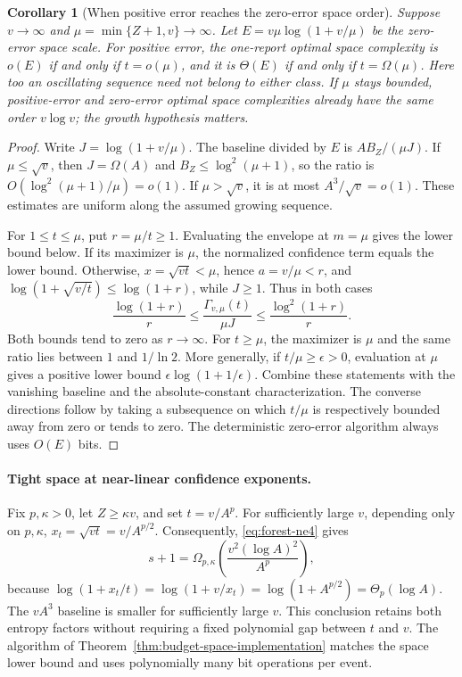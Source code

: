 \documentclass[11pt,letterpaper]{article}
\newtheorem{corollary}[theorem]{Corollary}
\numberwithin{equation}{section}
\begin{document}
\begin{corollary}[When positive error reaches the zero-error space order]
\label{cor:budget-saturation}
Suppose $v\to\infty$ and $\mu=\min\{Z+1,v\}\to\infty$.
Let $E=v\mu\log(1+v/\mu)$ be the zero-error space scale.
For positive error, the one-report optimal space complexity is $o(E)$ if and only if $t=o(\mu)$, and it is $\Theta(E)$ if and only if $t=\Omega(\mu)$.
Here too an oscillating sequence need not belong to either class.
If $\mu$ stays bounded, positive-error and zero-error optimal space complexities already have the same order $v\log v$; the growth hypothesis matters.
\end{corollary}
\begin{proof}
Write $J=\log(1+v/\mu)$.
The baseline divided by $E$ is $AB_Z/(\mu J)$.
If $\mu\le\sqrt v$, then $J=\Omega(A)$ and $B_Z\le\log^2(\mu+1)$, so the ratio is $O(\log^2(\mu+1)/\mu)=o(1)$.
If $\mu>\sqrt v$, it is at most $A^3/\sqrt v=o(1)$.
These estimates are uniform along the assumed growing sequence.

For $1\le t\le\mu$, put $r=\mu/t\ge1$.
Evaluating the envelope at $m=\mu$ gives the lower bound below.
If its maximizer is $\mu$, the normalized confidence term equals the lower bound.
Otherwise, $x=\sqrt{vt}<\mu$, hence $a=v/\mu<r$, and $\log(1+\sqrt{v/t})\le\log(1+r)$, while $J\ge1$.
Thus in both cases
\begin{equation}
\frac{\log(1+r)}r
 \le\frac{\Gamma_{v,\mu}(t)}{\mu J}
 \le\frac{\log^2(1+r)}r. \label{eq:ps1}
\end{equation}
Both bounds tend to zero as $r\to\infty$.
For $t\ge\mu$, the maximizer is $\mu$ and the same ratio lies between $1$ and $1/\ln2$.
More generally, if $t/\mu\ge\epsilon>0$, evaluation at $\mu$ gives a positive lower bound $\epsilon\log(1+1/\epsilon)$.
Combine these statements with the vanishing baseline and the absolute-constant characterization.
The converse directions follow by taking a subsequence on which $t/\mu$ is respectively bounded away from zero or tends to zero.
The deterministic zero-error algorithm always uses $O(E)$ bits.
\end{proof}

\paragraph{Tight space at near-linear confidence exponents.}
\label{app:nearlinear-specialization}
Fix $p,\kappa>0$, let $Z\ge\kappa v$, and set $t=v/A^p$.
For sufficiently large $v$, depending only on $p,\kappa$, $x_t=\sqrt{vt}=v/A^{p/2}$.
Consequently, \eqref{eq:forest-ne4} gives
\begin{equation}
s+1=\Omega_{p,\kappa}\!\left(
 \frac{v^2(\log A)^2}{A^p}\right),
 \label{eq:forest-ne5}
\end{equation}
because $\log(1+x_t/t)=\log(1+v/x_t)=\log(1+A^{p/2}) =\Theta_p(\log A)$.
The $vA^3$ baseline is smaller for sufficiently large $v$.
This conclusion retains both entropy factors without requiring a fixed polynomial gap between $t$ and $v$.
The algorithm of Theorem~\ref{thm:budget-space-implementation} matches the space lower bound and uses polynomially many bit operations per event.
\end{document}
